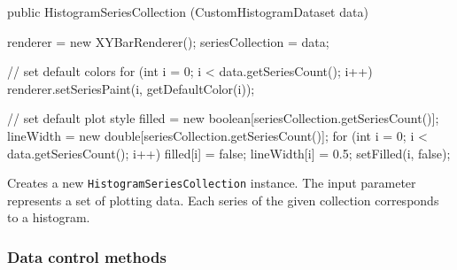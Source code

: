 \begin{code}

   public HistogramSeriesCollection (CustomHistogramDataset data) \begin{hide} {
      renderer = new XYBarRenderer();
      seriesCollection = data;

      // set default colors
      for (int i = 0; i < data.getSeriesCount(); i++) {
         renderer.setSeriesPaint(i, getDefaultColor(i));
      }

      // set default plot style
      filled = new boolean[seriesCollection.getSeriesCount()];
      lineWidth = new double[seriesCollection.getSeriesCount()];
      for (int i = 0; i < data.getSeriesCount(); i++) {
         filled[i] = false;
         lineWidth[i] = 0.5;
         setFilled(i, false);
      }
   }\end{hide}
\end{code}
\begin{tabb}
   Creates a new \texttt{HistogramSeriesCollection} instance.
   The input parameter represents a set of plotting data.
   Each series of the given collection corresponds to a histogram.
\end{tabb}
\begin{htmlonly}
\end{htmlonly}

\subsubsection*{Data control methods}

